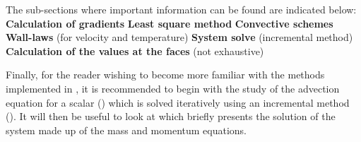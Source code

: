 The sub-sections where important information can be found are indicated
below:\newline
\newline
\nl \newline
\textbf{Calculation of gradients}\newline
\hspace*{1cm}\newline
\hspace*{1cm}\newline
\textbf{Least square method}\newline
\hspace*{1cm}\newline
\textbf{Convective schemes}\newline
\hspace*{1cm}\newline
\textbf{Wall-laws} (for velocity and temperature)\newline
\hspace*{1cm}\newline
\hspace*{1cm}\newline
\textbf{System solve} (incremental method)\newline
\hspace*{1cm}\newline
\textbf{Calculation of the values at the faces} (not exhaustive)\newline
\hspace*{1cm}\newline
\hspace*{1cm}\newline

Finally, for the reader wishing to become more familiar with the methods
implemented in \CS, it is recommended to begin with the study of the
advection equation for a scalar () which is solved iteratively
using an incremental method (). It will then be useful to look
at  which briefly presents the solution of the system made up
of the mass and momentum equations.

